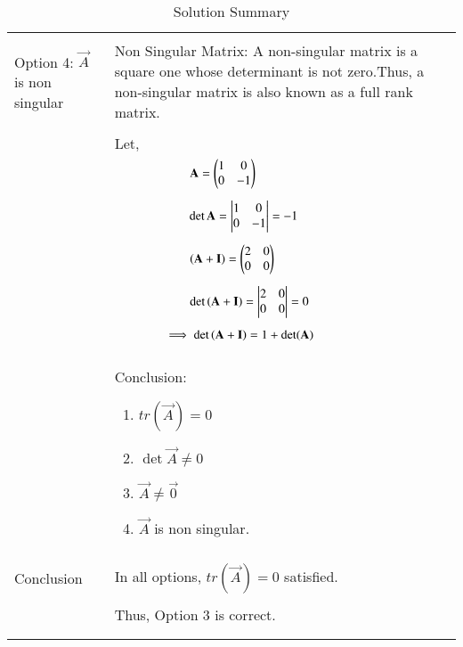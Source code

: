\documentclass[journal,12pt]{IEEEtran}
\begin{document}
\begin{longtable}{|p{5cm}|p{13cm}|}
    \hline
	\multirow{3}{*}{Option 4: $\vec{A}$ is non singular}&\\
  	& Non Singular Matrix:
A non-singular matrix is a square one whose determinant is not zero.Thus, a non-singular matrix is also known as a full rank matrix.\\
&\\
	& Let,\\
	& $\qquad\qquad\qquad\mathbf{A}=\begin{pmatrix}1&0\\0&-1\end{pmatrix}$\\
	&\\
	& $\qquad\qquad\qquad\det{\mathbf{A}} = \begin{vmatrix}1&0\\0&-1\end{vmatrix} = -1$\\
	&\\
	& $\qquad\qquad\qquad\left(\mathbf{A}+\mathbf{I}\right)=\begin{pmatrix}2&0\\0&0\end{pmatrix}$\\
	&\\
	& $\qquad\qquad\qquad\det\left(\mathbf{A}+\mathbf{I}\right)=\begin{vmatrix}2&0\\0&0\end{vmatrix}=0$\\
	&\\
	& $\qquad\qquad\implies\det\left(\mathbf{A}+\mathbf{I}\right)=1+\det(\mathbf{A})$\\
	&\\
	& Conclusion: {\begin{enumerate}
	\item $tr(\vec{A})=0$
	\item $\det{\vec{A}}\neq0$
	\item $\vec{A} \neq \vec{0}$
	\item $\vec{A}$ is non singular.\end{enumerate}}\\
	\hline
	\multirow{3}{*}{Conclusion}&\\
& In all options, $tr(\vec{A})=0$ satisfied.\\
&\\
& Thus, Option 3 is correct. \\
&\\

	\hline
	\caption{Solution Summary}
    \label{table:2}
\end{longtable}
\end{document}
